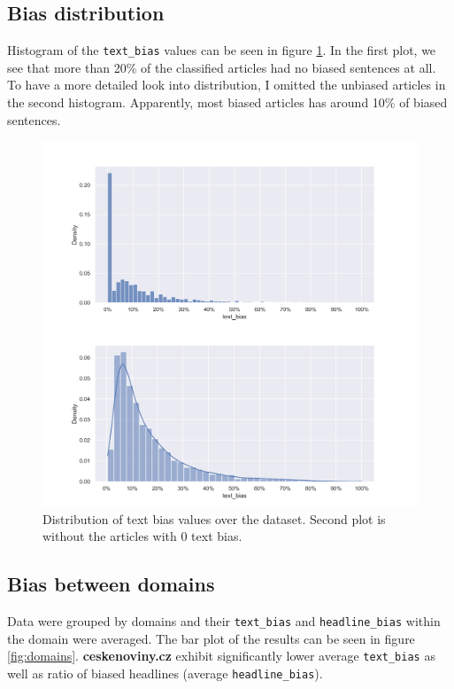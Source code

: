 \subsection{Bias distribution}
Histogram of the \verb|text_bias| values can be seen in figure \ref{fig:dists}. In the first plot, we see that more than 20\% of the classified articles had no biased sentences at all. To have a more detailed look into distribution, I omitted the unbiased articles in the second histogram. Apparently, most biased articles has around 10\% of biased sentences.


\begin{figure}

  \includegraphics[scale=0.5]{my_modules/multimedia/inference/dists.jpg}
  \caption{Distribution of text bias values over the dataset. Second plot is without the articles with 0 text bias.}
  \label{fig:dists}

\end{figure}


\newpage
\subsection{Bias between domains}
Data were grouped by domains and their \verb|text_bias| and \verb|headline_bias| within the domain were averaged. The bar plot of the results can be seen in figure \ref{fig:domains}. \textbf{ceskenoviny.cz} exhibit significantly lower average \verb|text_bias| as well as ratio of biased headlines (average \verb|headline_bias|).

